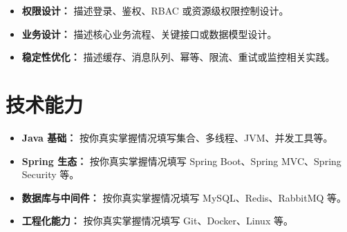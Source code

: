 \documentclass[11pt,a4paper]{article}
\begin{document}
\begin{itemize}
    \item \textbf{权限设计：} 描述登录、鉴权、RBAC 或资源级权限控制设计。
    \item \textbf{业务设计：} 描述核心业务流程、关键接口或数据模型设计。
    \item \textbf{稳定性优化：} 描述缓存、消息队列、幂等、限流、重试或监控相关实践。
\end{itemize}

\section*{技术能力}
\begin{itemize}
    \item \textbf{Java 基础：} 按你真实掌握情况填写集合、多线程、JVM、并发工具等。
    \item \textbf{Spring 生态：} 按你真实掌握情况填写 Spring Boot、Spring MVC、Spring Security 等。
    \item \textbf{数据库与中间件：} 按你真实掌握情况填写 MySQL、Redis、RabbitMQ 等。
    \item \textbf{工程化能力：} 按你真实掌握情况填写 Git、Docker、Linux 等。
\end{itemize}
\end{document}
